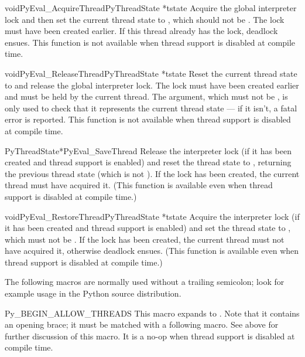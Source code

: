 \documentclass{manual}
\begin{document}
\begin{cfuncdesc}{void}{PyEval_AcquireThread}{PyThreadState *tstate}
Acquire the global interpreter lock and then set the current thread
state to , which should not be \NULL{}.  The lock must
have been created earlier.  If this thread already has the lock,
deadlock ensues.  This function is not available when thread support
is disabled at compile time.
\end{cfuncdesc}

\begin{cfuncdesc}{void}{PyEval_ReleaseThread}{PyThreadState *tstate}
Reset the current thread state to \NULL{} and release the global
interpreter lock.  The lock must have been created earlier and must be
held by the current thread.  The  argument, which must not
be \NULL{}, is only used to check that it represents the current
thread state --- if it isn't, a fatal error is reported.  This
function is not available when thread support is disabled at compile
time.
\end{cfuncdesc}

\begin{cfuncdesc}{PyThreadState*}{PyEval_SaveThread}{}
Release the interpreter lock (if it has been created and thread
support is enabled) and reset the thread state to \NULL{},
returning the previous thread state (which is not \NULL{}).  If
the lock has been created, the current thread must have acquired it.
(This function is available even when thread support is disabled at
compile time.)
\end{cfuncdesc}

\begin{cfuncdesc}{void}{PyEval_RestoreThread}{PyThreadState *tstate}
Acquire the interpreter lock (if it has been created and thread
support is enabled) and set the thread state to , which
must not be \NULL{}.  If the lock has been created, the current
thread must not have acquired it, otherwise deadlock ensues.  (This
function is available even when thread support is disabled at compile
time.)
\end{cfuncdesc}

The following macros are normally used without a trailing semicolon;
look for example usage in the Python source distribution.

\begin{csimplemacrodesc}{Py_BEGIN_ALLOW_THREADS}
This macro expands to
.
Note that it contains an opening brace; it must be matched with a
following  macro.  See above for further
discussion of this macro.  It is a no-op when thread support is
disabled at compile time.
\end{csimplemacrodesc}
\end{document}
